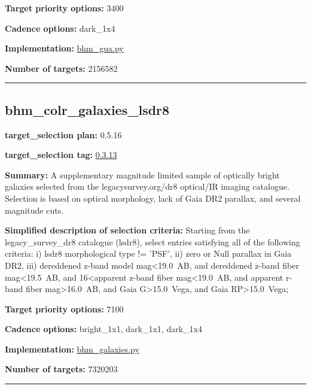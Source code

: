 \noindent\textbf{Target priority options:} 3400

\noindent\textbf{Cadence options:} dark\_1x4

\noindent\textbf{Implementation:}
\href{https://github.com/sdss/target_selection/blob/0.3.0/python/target_selection/cartons/bhm_gua.py}{bhm\_gua.py}

\noindent\textbf{Number of targets:} 2156582

\begin{center}\rule{0.5\linewidth}{0.5pt}\end{center}

\hypertarget{bhm_colr_galaxies_lsdr8_plan0.5.16}{%
\subsection{bhm\_colr\_galaxies\_lsdr8}\label{bhm_colr_galaxies_lsdr8_plan0.5.16}}

\noindent\textbf{target\_selection plan:} 0.5.16

\noindent\textbf{target\_selection tag:}
\href{https://github.com/sdss/target_selection/tree/0.3.13/}{0.3.13}

\noindent\textbf{Summary:} A supplementary magnitude limited sample of optically
bright galaxies selected from the legacysurvey.org/dr8 optical/IR
imaging catalogue. Selection is based on optical morphology, lack of
Gaia DR2 parallax, and several magnitude cuts.

\noindent\textbf{Simplified description of selection criteria:} Starting from the
legacy\_survey\_dr8 catalogue (lsdr8), select entries satisfying all of
the following criteria: i) lsdr8 morphological type != 'PSF', ii) zero
or Null parallax in Gaia DR2, iii) dereddened z-band model
mag\textless19.0~AB, and dereddened z-band fiber mag\textless19.5~AB,
and 16\textless apparent z-band fiber mag\textless19.0~AB, and apparent
r-band fiber mag\textgreater16.0~AB, and Gaia G\textgreater15.0~Vega,
and Gaia RP\textgreater15.0~Vega;


\noindent\textbf{Target priority options:} 7100

\noindent\textbf{Cadence options:} bright\_1x1, dark\_1x1, dark\_1x4

\noindent\textbf{Implementation:}
\href{https://github.com/sdss/target_selection/blob/0.3.13/python/target_selection/cartons/bhm_galaxies.py}{bhm\_galaxies.py}

\noindent\textbf{Number of targets:} 7320203

\begin{center}\rule{0.5\linewidth}{0.5pt}\end{center}

